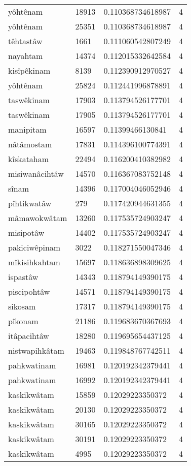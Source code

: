 \begin{longtable}{llll}
yôhtênam & 18913 & 0.110368734618987 & 4 \\
yôhtênam & 25351 & 0.110368734618987 & 4 \\
têhtastâw & 1661 & 0.111060542807249 & 4 \\
nayahtam & 14374 & 0.112015332642584 & 4 \\
kisîpêkinam & 8139 & 0.112390912970527 & 4 \\
yôhtênam & 25824 & 0.112441996878891 & 4 \\
taswêkinam & 17903 & 0.113794526177701 & 4 \\
taswêkinam & 17905 & 0.113794526177701 & 4 \\
manipitam & 16597 & 0.11399466130841 & 4 \\
nâtâmostam & 17831 & 0.114396100774391 & 4 \\
kîskataham & 22494 & 0.116200410382982 & 4 \\
misiwanâcihtâw & 14570 & 0.116367083752148 & 4 \\
sînam & 14396 & 0.117004046052946 & 4 \\
pîhtikwatâw & 279 & 0.117420944631355 & 4 \\
mâmawokwâtam & 13260 & 0.117535724903247 & 4 \\
misipotâw & 14402 & 0.117535724903247 & 4 \\
pakiciwêpinam & 3022 & 0.118271550047346 & 4 \\
mîkisihkahtam & 15697 & 0.118636898309625 & 4 \\
ispastâw & 14343 & 0.118794149390175 & 4 \\
piscipohtâw & 14571 & 0.118794149390175 & 4 \\
sikosam & 17317 & 0.118794149390175 & 4 \\
pîkonam & 21186 & 0.119683670367693 & 4 \\
itâpacihtâw & 18280 & 0.119695654437125 & 4 \\
nistwapihkâtam & 19463 & 0.119848767742511 & 4 \\
pahkwatinam & 16981 & 0.120192342379441 & 4 \\
pahkwatinam & 16992 & 0.120192342379441 & 4 \\
kaskikwâtam & 15859 & 0.12029223350372 & 4 \\
kaskikwâtam & 20130 & 0.12029223350372 & 4 \\
kaskikwâtam & 30165 & 0.12029223350372 & 4 \\
kaskikwâtam & 30191 & 0.12029223350372 & 4 \\
kaskikwâtam & 4995 & 0.12029223350372 & 4 \\

\end{longtable}
